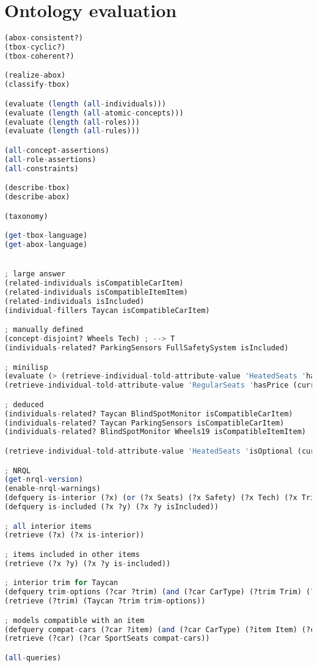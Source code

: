 \documentclass[a4paper,12pt]{report}
\begin{document}
\section{Ontology evaluation}
\lstset{style=mystyle}
\begin{lstlisting}[language=Octave]
(abox-consistent?)
(tbox-cyclic?)
(tbox-coherent?)

(realize-abox)
(classify-tbox)

(evaluate (length (all-individuals)))
(evaluate (length (all-atomic-concepts)))
(evaluate (length (all-roles)))
(evaluate (length (all-rules)))

(all-concept-assertions)
(all-role-assertions)
(all-constraints)

(describe-tbox)
(describe-abox)

(taxonomy)

(get-tbox-language)
(get-abox-language)


; large answer
(related-individuals isCompatibleCarItem)
(related-individuals isCompatibleItemItem)
(related-individuals isIncluded)
(individual-fillers Taycan isCompatibleCarItem)

; manually defined
(concept-disjoint? Wheels Tech) ; --> T
(individuals-related? ParkingSensors FullSafetySystem isIncluded)

; minilisp
(evaluate (> (retrieve-individual-told-attribute-value 'HeatedSeats 'hasPrice (current-abox))
(retrieve-individual-told-attribute-value 'RegularSeats 'hasPrice (current-abox))))

; deduced
(individuals-related? Taycan BlindSpotMonitor isCompatibleCarItem)
(individuals-related? Taycan ParkingSensors isCompatibleCarItem)
(individuals-related? BlindSpotMonitor Wheels19 isCompatibleItemItem)

(retrieve-individual-told-attribute-value 'HeatedSeats 'isOptional (current-abox))

; NRQL
(get-nrql-version)
(enable-nrql-warnings)
(defquery is-interior (?x) (or (?x Seats) (?x Safety) (?x Tech) (?x Trim)))
(defquery is-included (?x ?y) (?x ?y isIncluded))

; all interior items
(retrieve (?x) (?x is-interior))

; items included in other items
(retrieve (?x ?y) (?x ?y is-included))

; interior trim for Taycan
(defquery trim-options (?car ?trim) (and (?car CarType) (?trim Trim) (?car ?trim isCompatibleCarItem)))
(retrieve (?trim) (Taycan ?trim trim-options))

; models compatible with an item
(defquery compat-cars (?car ?item) (and (?car CarType) (?item Item) (?car ?item isCompatibleCarItem)))
(retrieve (?car) (?car SportSeats compat-cars))

(all-queries)


\end{lstlisting}
\end{document}
